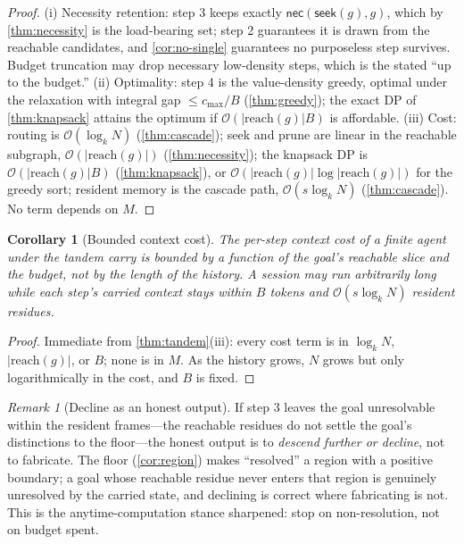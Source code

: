 \documentclass[11pt,twocolumn,a4paper]{article}
\theoremstyle{thmstyle}
\newtheorem{corollary}[theorem]{Corollary}
\theoremstyle{definition}
\theoremstyle{remark}
\newtheorem{remark}[theorem]{Remark}
\newcommand{\goal}{g}                   %
\newcommand{\reach}{\mathrm{reach}}
\newcommand{\budget}{B}
\newcommand{\seek}{\textsf{seek}}
\newcommand{\nec}{\textsf{nec}}
\newcommand{\cost}{c}                   %
\newcommand{\abs}[1]{\lvert#1\rvert}
\begin{document}
\begin{proof}
(i) Necessity retention: step 3 keeps exactly $\nec(\seek(\goal),\goal)$, which by
\cref{thm:necessity} is the load-bearing set; step 2 guarantees it is drawn from
the reachable candidates, and \cref{cor:no-single} guarantees no purposeless step
survives. Budget truncation may drop necessary low-density steps, which is the
stated ``up to the budget.''
(ii) Optimality: step 4 is the value-density greedy, optimal under the relaxation
with integral gap $\le\cost_{\max}/\budget$ (\cref{thm:greedy}); the exact DP of
\cref{thm:knapsack} attains the optimum if $\mathcal{O}(\abs{\reach(\goal)}\budget)$
is affordable.
(iii) Cost: routing is $\mathcal{O}(\log_k N)$ (\cref{thm:cascade}); seek and
prune are linear in the reachable subgraph, $\mathcal{O}(\abs{\reach(\goal)})$
(\cref{thm:necessity}); the knapsack DP is
$\mathcal{O}(\abs{\reach(\goal)}\budget)$ (\cref{thm:knapsack}), or
$\mathcal{O}(\abs{\reach(\goal)}\log\abs{\reach(\goal)})$ for the greedy sort;
resident memory is the cascade path, $\mathcal{O}(s\log_k N)$ (\cref{thm:cascade}).
No term depends on $M$.
\end{proof}

\begin{corollary}[Bounded context cost]
\label{cor:bounded}
The per-step context cost of a finite agent under the tandem carry is bounded by
a function of the goal's reachable slice and the budget, not by the length of the
history. A session may run arbitrarily long while each step's carried context
stays within $\budget$ tokens and $\mathcal{O}(s\log_k N)$ resident residues.
\end{corollary}

\begin{proof}
Immediate from \cref{thm:tandem}(iii): every cost term is in $\log_k N$,
$\abs{\reach(\goal)}$, or $\budget$; none is in $M$. As the history grows, $N$
grows but only logarithmically in the cost, and $\budget$ is fixed.
\end{proof}

\begin{remark}[Decline as an honest output]
\label{rem:decline}
If step 3 leaves the goal unresolvable within the resident frames---the reachable
residues do not settle the goal's distinctions to the floor---the honest output
is to \emph{descend further or decline}, not to fabricate. The floor
(\cref{cor:region}) makes ``resolved'' a region with a positive boundary; a goal
whose reachable residue never enters that region is genuinely unresolved by the
carried state, and declining is correct where fabricating is not. This is the
anytime-computation stance \citep{dean1988,zilberstein1996} sharpened: stop on
non-resolution, not on budget spent.
\end{remark}
\end{document}
